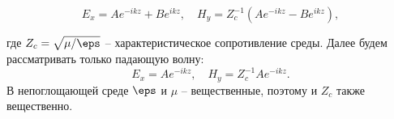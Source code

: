 \documentclass[a4paper, oneside, 12pt]{book}
\begin{document}
\[
    E_x = Ae^{-ikz} + Be^{ikz},\quad H_y = Z_c^{-1} (Ae^{-ikz} - Be^{ikz}),
\]

где \( Z_c = \sqrt{\mu / \eps} \) -- характеристическое сопротивление среды.
Далее будем рассматривать только падающую волну:
\[
    E_x = Ae^{-ikz},\quad H_y = Z_c^{-1} Ae^{-ikz}.
\]
В непоглощающей среде \(\eps\) и \(\mu\) -- вещественные, поэтому и \(Z_c\)
также вещественно.
\end{document}
